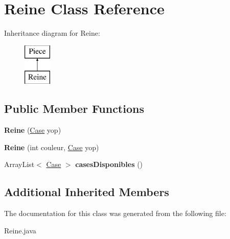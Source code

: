 \hypertarget{class_reine}{}\section{Reine Class Reference}
\label{class_reine}
Inheritance diagram for Reine\+:\begin{figure}[H]
\begin{center}
\leavevmode
\includegraphics[height=2.000000cm]{class_reine}
\end{center}
\end{figure}
\subsection*{Public Member Functions}
\begin{DoxyCompactItemize}
\item 
{\bfseries Reine} (\hyperlink{class_case}{Case} yop)\hypertarget{class_reine_abba411a6ba9559a831382cc4eee14afc}{}\label{class_reine_abba411a6ba9559a831382cc4eee14afc}

\item 
{\bfseries Reine} (int couleur, \hyperlink{class_case}{Case} yop)\hypertarget{class_reine_ae5d6a09e7c2df6dd38ff96a062ed25aa}{}\label{class_reine_ae5d6a09e7c2df6dd38ff96a062ed25aa}

\item 
Array\+List$<$ \hyperlink{class_case}{Case} $>$ {\bfseries cases\+Disponibles} ()\hypertarget{class_reine_ae44179f3ff14bc9221fdb18fbbfb57fd}{}\label{class_reine_ae44179f3ff14bc9221fdb18fbbfb57fd}

\end{DoxyCompactItemize}
\subsection*{Additional Inherited Members}


The documentation for this class was generated from the following file\+:\begin{DoxyCompactItemize}
\item 
Reine.\+java\end{DoxyCompactItemize}
